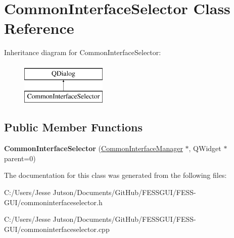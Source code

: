 \hypertarget{class_common_interface_selector}{}\section{Common\+Interface\+Selector Class Reference}
\label{class_common_interface_selector}
Inheritance diagram for Common\+Interface\+Selector\+:\begin{figure}[H]
\begin{center}
\leavevmode
\includegraphics[height=2.000000cm]{class_common_interface_selector}
\end{center}
\end{figure}
\subsection*{Public Member Functions}
\begin{DoxyCompactItemize}
\item 
\hypertarget{class_common_interface_selector_a46da3e73aa0868810dbd80a42281a6c8}{}\label{class_common_interface_selector_a46da3e73aa0868810dbd80a42281a6c8} 
{\bfseries Common\+Interface\+Selector} (\hyperlink{class_common_interface_manager}{Common\+Interface\+Manager} $\ast$, Q\+Widget $\ast$parent=0)
\end{DoxyCompactItemize}


The documentation for this class was generated from the following files\+:\begin{DoxyCompactItemize}
\item 
C\+:/\+Users/\+Jesse Jutson/\+Documents/\+Git\+Hub/\+F\+E\+S\+S\+G\+U\+I/\+F\+E\+S\+S-\/\+G\+U\+I/commoninterfaceselector.\+h\item 
C\+:/\+Users/\+Jesse Jutson/\+Documents/\+Git\+Hub/\+F\+E\+S\+S\+G\+U\+I/\+F\+E\+S\+S-\/\+G\+U\+I/commoninterfaceselector.\+cpp\end{DoxyCompactItemize}
